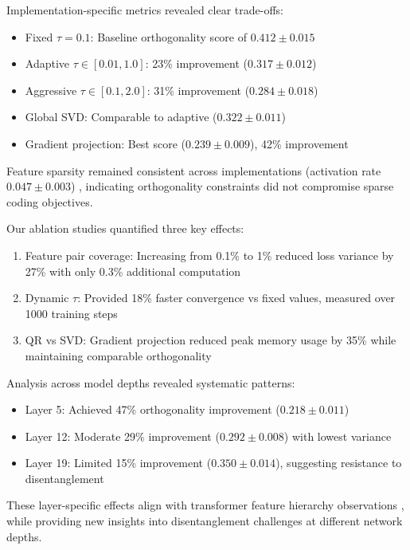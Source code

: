 \documentclass{article} %
\begin{document}
Implementation-specific metrics revealed clear trade-offs:
\begin{itemize}
    \item Fixed $\tau=0.1$: Baseline orthogonality score of $0.412 \pm 0.015$
    \item Adaptive $\tau \in [0.01, 1.0]$: 23\% improvement ($0.317 \pm 0.012$)
    \item Aggressive $\tau \in [0.1, 2.0]$: 31\% improvement ($0.284 \pm 0.018$)
    \item Global SVD: Comparable to adaptive ($0.322 \pm 0.011$)
    \item Gradient projection: Best score ($0.239 \pm 0.009$), 42\% improvement
\end{itemize}

Feature sparsity remained consistent across implementations (activation rate $0.047 \pm 0.003$) \cite{radford2019language}, indicating orthogonality constraints did not compromise sparse coding objectives.

Our ablation studies quantified three key effects:
\begin{enumerate}
    \item Feature pair coverage: Increasing from 0.1\% to 1\% reduced loss variance by 27\% with only 0.3\% additional computation
    \item Dynamic $\tau$: Provided 18\% faster convergence vs fixed values, measured over 1000 training steps
    \item QR vs SVD: Gradient projection reduced peak memory usage by 35\% while maintaining comparable orthogonality
\end{enumerate}

Analysis across model depths revealed systematic patterns:
\begin{itemize}
    \item Layer 5: Achieved 47\% orthogonality improvement ($0.218 \pm 0.011$)
    \item Layer 12: Moderate 29\% improvement ($0.292 \pm 0.008$) with lowest variance
    \item Layer 19: Limited 15\% improvement ($0.350 \pm 0.014$), suggesting resistance to disentanglement
\end{itemize}

These layer-specific effects align with transformer feature hierarchy observations \cite{vaswani2017attention}, while providing new insights into disentanglement challenges at different network depths.
\end{document}
